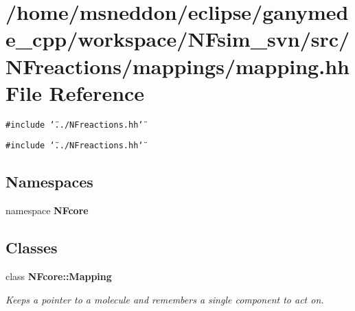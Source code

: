 \section{/home/msneddon/eclipse/ganymede\_\-cpp/workspace/NFsim\_\-svn/src/NFreactions/mappings/mapping.hh File Reference}
\label{mapping_8hh}


{\tt \#include \char`\"{}../NFreactions.hh\char`\"{}}\par
{\tt \#include \char`\"{}../NFreactions.hh\char`\"{}}\par
\subsection*{Namespaces}
\begin{CompactItemize}
\item 
namespace {\bf NFcore}
\end{CompactItemize}
\subsection*{Classes}
\begin{CompactItemize}
\item 
class {\bf NFcore::Mapping}
\begin{CompactList}\small\item\em Keeps a pointer to a molecule and remembers a single component to act on. \item\end{CompactList}\end{CompactItemize}
